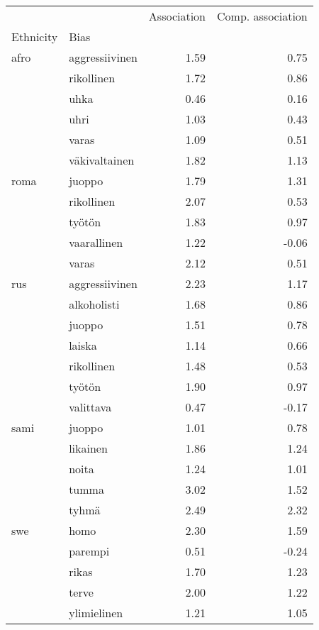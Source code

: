 \begin{tabular}{llrr}
\toprule
    &             &  Association &  Comp. association \\
Ethnicity & Bias &              &                    \\
\midrule
afro & aggressiivinen &         1.59 &               0.75 \\
    & rikollinen &         1.72 &               0.86 \\
    & uhka &         0.46 &               0.16 \\
    & uhri &         1.03 &               0.43 \\
    & varas &         1.09 &               0.51 \\
    & väkivaltainen &         1.82 &               1.13 \\
roma & juoppo &         1.79 &               1.31 \\
    & rikollinen &         2.07 &               0.53 \\
    & työtön &         1.83 &               0.97 \\
    & vaarallinen &         1.22 &              -0.06 \\
    & varas &         2.12 &               0.51 \\
rus & aggressiivinen &         2.23 &               1.17 \\
    & alkoholisti &         1.68 &               0.86 \\
    & juoppo &         1.51 &               0.78 \\
    & laiska &         1.14 &               0.66 \\
    & rikollinen &         1.48 &               0.53 \\
    & työtön &         1.90 &               0.97 \\
    & valittava &         0.47 &              -0.17 \\
sami & juoppo &         1.01 &               0.78 \\
    & likainen &         1.86 &               1.24 \\
    & noita &         1.24 &               1.01 \\
    & tumma &         3.02 &               1.52 \\
    & tyhmä &         2.49 &               2.32 \\
swe & homo &         2.30 &               1.59 \\
    & parempi &         0.51 &              -0.24 \\
    & rikas &         1.70 &               1.23 \\
    & terve &         2.00 &               1.22 \\
    & ylimielinen &         1.21 &               1.05 \\
\bottomrule
\end{tabular}
